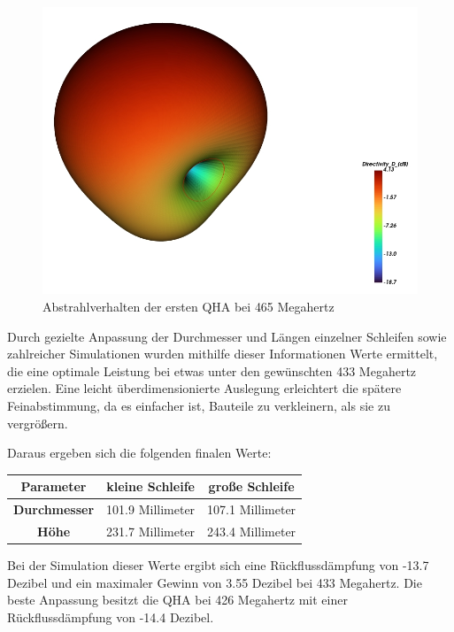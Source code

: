 \begin{figure} [H]
	\centering
	\includegraphics[width=.75\linewidth]{../ref/radiation_pattern_old_qfh.png}
	\caption{Abstrahlverhalten der ersten QHA bei 465 Megahertz}
	\label{fig:rp_old_qha}
\end{figure}

Durch gezielte Anpassung der Durchmesser und Längen einzelner Schleifen sowie zahlreicher Simulationen wurden mithilfe dieser Informationen Werte ermittelt, die eine optimale Leistung bei etwas unter den gewünschten 433 Megahertz erzielen. Eine leicht überdimensionierte Auslegung erleichtert die spätere Feinabstimmung, da es einfacher ist, Bauteile zu verkleinern, als sie zu vergrößern.

Daraus ergeben sich die folgenden finalen Werte:

\begin{center}
	\begin{tabular}{|c|c|c|}
		\hline
		\textbf{Parameter} & \textbf{kleine Schleife} & \textbf{große Schleife} \\
		\hline
		\textbf{Durchmesser} & 101.9 Millimeter & 107.1 Millimeter \\
		\hline
		\textbf{Höhe} & 231.7 Millimeter & 243.4 Millimeter \\
		\hline
	\end{tabular}
\end{center} 

Bei der Simulation dieser Werte ergibt sich eine Rückflussdämpfung von -13.7 Dezibel und ein maximaler Gewinn von 3.55 Dezibel bei 433 Megahertz. Die beste Anpassung besitzt die QHA bei 426 Megahertz mit einer Rückflussdämpfung von -14.4 Dezibel.

